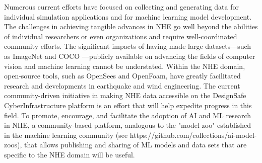 Numerous current efforts have focused on collecting and generating data for individual simulation applications and for machine learning model development. The challenges in achieving tangible advances in NHE go well beyond the abilities of individual researchers or even organizations and require well-coordinated community efforts. The significant impacts of having made large datasets—such as ImageNet \citep{deng2009imagenet} and COCO \citep{lin2014microsoft}—publicly available on advancing the fields of computer vision and machine learning cannot be understated. Within the NHE domain, open-source tools, such as OpenSees \citep{mckenna2011opensees} and OpenFoam\citep{chen2014}, have greatly facilitated research and developments in earthquake and wind engineering. The current community-driven initiative in making NHE data accessible on the DesignSafe CyberInfrastructure platform is an effort that will help expedite progress in this field\citep{rathje2017}. To promote, encourage, and facilitate the adoption of AI and ML research in NHE, a community-based platform, analogous to the "model zoo" established in the machine learning community (see https://github.com/collections/ai-model-zoos), that allows publishing and sharing of ML models and data sets that are specific to the NHE domain will be useful. 

